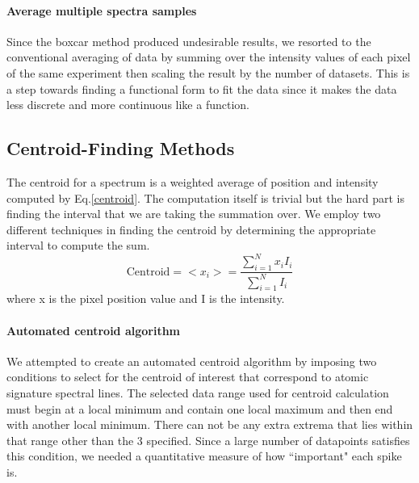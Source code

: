 \documentclass[authoryear,12pt,5p,times]{elsarticle}
\begin{document}
 \paragraph*{\textbf{Average multiple spectra samples}}
Since the boxcar method produced undesirable results, we resorted to the conventional averaging of data by summing over the intensity values of each pixel of the same experiment then scaling the result by the number of datasets. This is a step towards finding a functional form to fit the data since it makes the data less discrete and more continuous like a function. 
	\subsection{Centroid-Finding Methods}
	The centroid for a spectrum is a weighted average of position and intensity computed by Eq.\ref{centroid}. The computation itself is trivial but the hard part is finding the interval that we are taking the summation over. We employ two different techniques in finding the centroid by determining the appropriate interval to compute the sum.
	\begin{equation}
	\textrm{Centroid} =<x_i>=\frac{\sum\limits^N_{i=1}x_i I_i}{\sum\limits^N_{i=1}I_i}
	\label{centroid}
	\end{equation}
	where x is the pixel position value and I is the intensity.
	\paragraph*{\textbf{Automated centroid algorithm}}
 We attempted to create an automated centroid algorithm by imposing two conditions to select for the centroid of interest that correspond to atomic signature spectral lines. The selected data range used for centroid calculation must begin at a local minimum and contain one local maximum and then end with another local minimum. There can not be any extra extrema that lies within that range other than the 3 specified. Since a large number of datapoints satisfies this condition, we needed a quantitative measure of how ``important" each spike is.  
 
\end{document}
